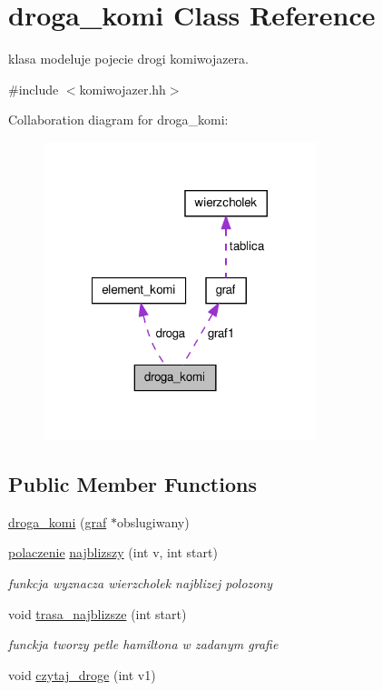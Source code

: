 \hypertarget{classdroga__komi}{\section{droga\-\_\-komi \-Class \-Reference}
\label{classdroga__komi}
}


klasa modeluje pojecie drogi komiwojazera.  




{\ttfamily \#include $<$komiwojazer.\-hh$>$}



\-Collaboration diagram for droga\-\_\-komi\-:
\nopagebreak
\begin{figure}[H]
\begin{center}
\leavevmode
\includegraphics[width=224pt]{classdroga__komi__coll__graph}
\end{center}
\end{figure}
\subsection*{\-Public \-Member \-Functions}
\begin{DoxyCompactItemize}
\item 
\hyperlink{classdroga__komi_a4ac601fcf068b22d5cb6a4f0e9ae8386}{droga\-\_\-komi} (\hyperlink{classgraf}{graf} $\ast$obslugiwany)
\item 
\hyperlink{structpolaczenie}{polaczenie} \hyperlink{classdroga__komi_a1acfde1a8989daab4b6a03cbc660ea7e}{najblizszy} (int v, int start)
\begin{DoxyCompactList}\small\item\em funkcja wyznacza wierzcholek najblizej polozony \end{DoxyCompactList}\item 
void \hyperlink{classdroga__komi_a7d6a3684fd92f231b31597a24e3e6914}{trasa\-\_\-najblizsze} (int start)
\begin{DoxyCompactList}\small\item\em funckja tworzy petle hamiltona w zadanym grafie \end{DoxyCompactList}\item 
void \hyperlink{classdroga__komi_accef23783e2fc22179eee5aea746e0f4}{czytaj\-\_\-droge} (int v1)
\end{DoxyCompactItemize}
